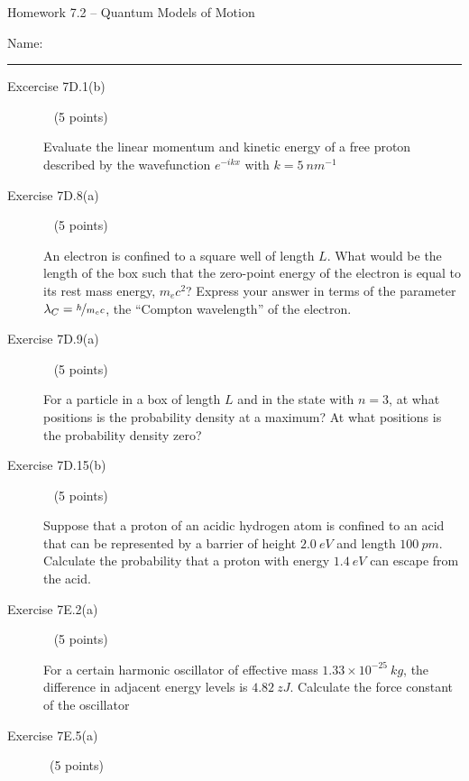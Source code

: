 \documentclass[10pt, letterpaper]{memoir}
\begin{document}
\begin{center}
	{\large Homework 7.2 -- Quantum Models of Motion}
\end{center}

Name: \rule[-.1mm]{15em}{0.1pt}

\begin{description}
	\item [Excercise 7D.1(b)] ~ (5 points)

	      Evaluate the linear momentum and kinetic energy of a free proton described by the wavefunction $e^{-ikx}$ with $k=5~nm^{-1}$

	      \vspace{12em}
	\item [Exercise 7D.8(a)] ~ (5 points)

	      An electron is confined to a square well of length $L$. What would be the length of the box such that the zero-point energy of the electron is equal to its rest mass energy, $m_ec^2$? Express your answer in terms of the parameter $\lambda_C=\nicefrac{h}{m_ec}$, the ``Compton wavelength'' of the electron.

	      \vspace{20em}
	\item [Exercise 7D.9(a)] ~ (5 points)

	      For a particle in a box of length $L$  and in the state with $n=3$, at what positions is the probability density at a maximum? At what positions is the probability density zero?

	      \vspace{13em}
	\item [Exercise 7D.15(b)] ~ (5 points)

	      Suppose that a proton of an acidic hydrogen atom is confined to an acid that can be represented by a barrier of height $2.0~eV$ and length $100~pm$. Calculate the probability that a proton with energy $1.4~eV$ can escape from the acid.

	      \vspace{14em}
	\item [Exercise 7E.2(a)] ~ (5 points)

	      For a certain harmonic oscillator of effective mass $1.33\times10^{-25}~kg$, the difference in adjacent energy levels is $4.82~zJ$. Calculate the force constant of the oscillator

	      \vspace{12em}
	\item [Exercise 7E.5(a)] ~(5 points)


\end{description}
\end{document}

